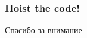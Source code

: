 \documentclass{beamer}
\begin{document}
\begin{frame}
\frametitle{Hoist the code!}

\begin{block}{}
\end{block}


\end{frame}

\begin{frame}{Спасибо за внимание}
\end{frame}
\end{document}
